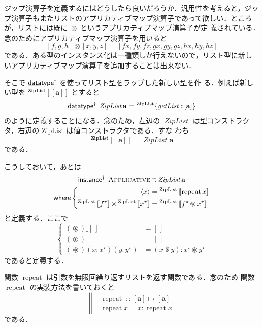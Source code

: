 \documentclass[a5paper,twoside,fleqn,draft]{jsbook}
\def\[{\left[\!\left[}
\def\]{\right]\!\right]}
\newcommand{\mBrace}{\Vert}
\newcommand{\mKeyword}[1]{\mathsf{#1}} %
\newcommand{\mKeywordUnderline}[1]{\text{\underline{\textsf{#1}}}} %
\newcommand{\mDataTypeKeyword}{\mKeywordUnderline{data}\mKeyword{type}}
\newcommand{\mInstanceKeyword}{\mKeyword{instance}}
\newcommand{\mWhereKeyword}{\mKeyword{where}}
\DeclareMathOperator{\mDataTypeParametric}{\mDataTypeKeyword^\dagger}
\DeclareMathOperator{\mInstanceParametric}{\mInstanceKeyword^{\dagger}}
\DeclareMathOperator{\mSuperSet}{\supset}
\DeclareMathOperator{\mWhere}{\mWhereKeyword}
\newcommand{\mEmptyList}{{[\,]}}
\newcommand{\mAnyParam}{\_}
\newcommand{\mFunc}[1]{\mathop{\mathit{#1}}}
\newcommand{\mSpecialFunc}[1]{\mathrm{#1}}
\DeclareMathOperator{\mGetList}{\mFunc{getList}}
\DeclareMathOperator{\mRepeat}{\mSpecialFunc{repeat}}
\DeclareMathOperator{\mApply}{\$}
\DeclareMathOperator{\mAppMap}{\times}
\DeclareMathOperator{\mAppMapList}{\otimes}
\DeclareMathOperator{\mIn}{{:\!:}}
\DeclareMathOperator{\mMapsTo}{\mapsto}
\DeclareMathOperator{\mZip}{\circledast}
\newcommand{\mZipList}{ZipList}
\newcommand{\mType}[1]{\mathbf{#1}}
\newcommand{\mListType}[1]{[\mType{#1}]}
\newcommand{\mGenericTypeAssemble}[2]{{}^{\mType{#1}}\[\mType{#2}\]}
\newcommand{\mZipListType}[1]{\mGenericTypeAssemble{\mZipList}{#1}}
\newcommand{\mTypeConstructor}[1]{\textit{#1}}
\DeclareMathOperator{\mZipListTypeConstructor}{\mTypeConstructor{\mZipList}}
\newcommand{\mValueConstructor}[1]{\mathrm{#1}}
\newcommand{\mGenericValueAssemble}[2]{{}^\mValueConstructor{#1}\[#2\]}
\newcommand{\mGenericRecordWith}[2]{{}^\mValueConstructor{#1}\{#2\}}
\newcommand{\mZipListWith}[1]{\mGenericValueAssemble{\mZipList}{#1}}
\newcommand{\mListWith}[1]{\left[#1\right]}
\newcommand{\mPureWith}[1]{\langle#1\rangle}
\newcommand{\mGenericTypeClass}[1]{\textsc{#1}} %
\newcommand{\mApplicativeTypeClass}{\mGenericTypeClass{Applicative}}
\newcommand{\mList}[1]{{#1}^\mathrm{\star}}
\newcommand{\mProj}[2]{#1\mMapsTo#2}
\begin{document}
ジップ演算子を定義するにはどうしたら良いだろうか．汎用性を考えると，ジッ
プ演算子もまたリストのアプリカティブマップ演算子であって欲しい．ところ
が，リストには既に $\mAppMapList$ というアプリカティブマップ演算子が定
義されている．念のためにアプリカティブマップ演算子を用いると
\begin{equation}
\mListWith{f,g,h}\mAppMapList\mListWith{x,y,z}=\mListWith{fx,fy,fz,gx,gy,gz,hx,hy,hz}
\end{equation}
である．ある型のインスタンス化は一種類しか行えないので，リスト型に新し
いアプリカティブマップ演算子を追加することは出来ない．

そこで $\mDataTypeParametric$ を使ってリスト型をラップした新しい型を作
る．例えば新しい型を $\mZipListType{a}$ とすると
\begin{equation}
  \label{eq:data-type-ziplist}
  \mDataTypeParametric\;\mathop{\mZipListTypeConstructor}\mType{a}
  =\mGenericRecordWith{\mZipList}{\mGetList\mIn{}\mListType{a}}
\end{equation}
のように定義することになる．念のため，左辺の
$\mZipListTypeConstructor$ は型コンストラクタ，右辺の
$\mValueConstructor{\mZipList}$ は値コンストラクタである．すな
わち
\begin{equation}
\mZipListType{a}=\mZipListTypeConstructor\mType{a}
\end{equation}
である．

こうしておいて，あとは
\begin{multline}
\mInstanceParametric\;
\mApplicativeTypeClass\mSuperSet\mZipListTypeConstructor\mType{a}\\
\mWhere
\left\{
\begin{aligned}
\mPureWith{x}&=\mZipListWith{\mRepeat x}\\
\mZipListWith{\mList{f}}\mAppMap\mZipListWith{\mList{x}}
&=\mZipListWith{\mList{f}\mZip\mList{x}}
\end{aligned}
\right.
\end{multline}
と定義する．ここで
\begin{equation}
  \label{eq:zip}
  \left\{
  \begin{aligned}
    (\mZip)\mAnyParam\mEmptyList&=\mEmptyList\\
    (\mZip)\mEmptyList\mAnyParam&=\mEmptyList\\
    (\mZip)(x:\mList{x})(y:\mList{y})&=(x\mApply y):\mList{x}\mZip\mList{y}
  \end{aligned}
  \right.
\end{equation}
であると定義する．

関数 $\mRepeat$ は引数を無限回繰り返すリストを返す関数である．念のため
関数 $\mRepeat$ の実装方法を書いておくと
\begin{equation}
  \left\mBrace
  \begin{aligned}
    &\mRepeat\mIn{}\mProj{\mListType{a}}{\mListType{a}}\\
    &\mRepeat x=x:\mRepeat x
  \end{aligned}
  \right.
\end{equation}
である．
\end{document}

